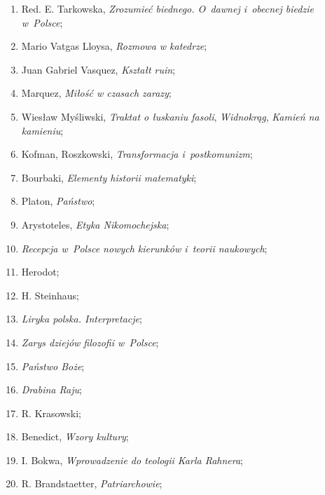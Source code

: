 \documentclass[a4paper,11pt]{article}
\begin{document}
\begin{enumerate}
\item Red. E. Tarkowska, \textit{Zrozumieć biednego. O~dawnej i~obecnej
    biedzie w~Polsce};

\item Mario Vatgas Lloysa, \textit{Rozmowa w katedrze};

\item Juan Gabriel Vasquez, \textit{Kształt ruin};

\item Marquez, \textit{Miłość w czasach zarazy};

\item Wiesław Myśliwski, \textit{Traktat o łuskaniu fasoli},
  \textit{Widnokrąg}, \textit{Kamień na kamieniu};

\item Kofman, Roszkowski, \textit{Transformacja i~postkomunizm};

\item Bourbaki, \textit{Elementy historii matematyki};

\item Platon, \textit{Państwo};

\item Arystoteles, \textit{Etyka Nikomochejska};

\item \textit{Recepcja w~Polsce nowych kierunków i~teorii naukowych};

\item Herodot;

\item H. Steinhaus;

\item \textit{Liryka polska. Interpretacje};

\item \textit{Zarys dziejów filozofii w~Polsce};

\item \textit{Państwo Boże};

\item \textit{Drabina Raju};

\item R. Krasowski;

\item Benedict, \textit{Wzory kultury};

\item I. Bokwa, \textit{Wprowadzenie do teologii Karla Rahnera};

\item R. Brandstaetter, \textit{Patriarchowie};


\end{enumerate}
\end{document}
